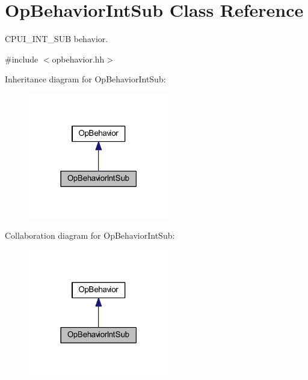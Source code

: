 \hypertarget{class_op_behavior_int_sub}{}\section{Op\+Behavior\+Int\+Sub Class Reference}
\label{class_op_behavior_int_sub}


C\+P\+U\+I\+\_\+\+I\+N\+T\+\_\+\+S\+UB behavior.  




{\ttfamily \#include $<$opbehavior.\+hh$>$}



Inheritance diagram for Op\+Behavior\+Int\+Sub\+:
\nopagebreak
\begin{figure}[H]
\begin{center}
\leavevmode
\includegraphics[width=174pt]{class_op_behavior_int_sub__inherit__graph}
\end{center}
\end{figure}


Collaboration diagram for Op\+Behavior\+Int\+Sub\+:
\nopagebreak
\begin{figure}[H]
\begin{center}
\leavevmode
\includegraphics[width=174pt]{class_op_behavior_int_sub__coll__graph}
\end{center}
\end{figure}
